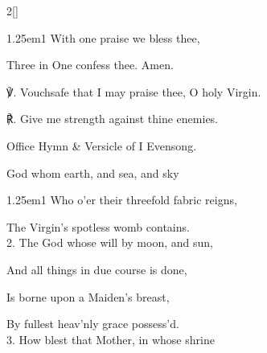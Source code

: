 \begin{paracol}{2}[]
\begin{hangparas}{1.25em}{1}
With one praise we bless thee,

Three in One confess thee. Amen.\\
\end{hangparas}

℣. Vouchsafe that I may praise thee, O holy Virgin.

℟. Give me strength against thine enemies.


\secondEvensong


\begin{rubric}
	Office Hymn \& Versicle of I Evensong.
\end{rubric}


\switchcolumn

\mattins


\vspace{-1\baselineskip}

\mattinsInvitatoryHymn\label{BVMInvitatory}

 God whom earth, and sea, and sky


\begin{hangparas}{1.25em}{1}
Who o'er their threefold fabric reigns,

The Virgin's spotless womb contains.\\

2. The God whose will by moon, and sun,

And all things in due course is done,

Is borne upon a Maiden's breast,

By fullest heav’nly grace possess'd.\\

3. How blest that Mother, in whose shrine


\end{hangparas}
\end{paracol}
